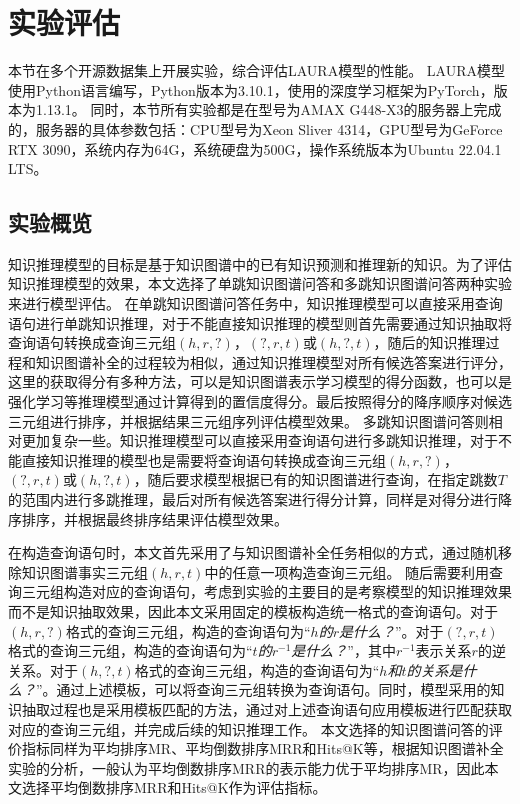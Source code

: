 \documentclass[algorithmlist, AutoFakeBold, AutoFakeSlant, figurelist, tablelist, nomlist, engineering]{seuthesix}
\begin{document}
\section{实验评估}
本节在多个开源数据集上开展实验，综合评估LAURA模型的性能。
LAURA模型使用Python语言编写，Python版本为3.10.1，使用的深度学习框架为PyTorch，版本为1.13.1。
同时，本节所有实验都是在型号为AMAX G448-X3的服务器上完成的，服务器的具体参数包括：CPU型号为Xeon Sliver 4314，GPU型号为GeForce RTX 3090，系统内存为64G，系统硬盘为500G，操作系统版本为Ubuntu 22.04.1 LTS。

\subsection{实验概览}
知识推理模型的目标是基于知识图谱中的已有知识预测和推理新的知识。为了评估知识推理模型的效果，本文选择了单跳知识图谱问答和多跳知识图谱问答两种实验来进行模型评估。
在单跳知识图谱问答任务中，知识推理模型可以直接采用查询语句进行单跳知识推理，对于不能直接知识推理的模型则首先需要通过知识抽取将查询语句转换成查询三元组$(h, r, ?)$，$(?, r, t)$或$(h, ?, t)$，随后的知识推理过程和知识图谱补全的过程较为相似，通过知识推理模型对所有候选答案进行评分，这里的获取得分有多种方法，可以是知识图谱表示学习模型的得分函数，也可以是强化学习等推理模型通过计算得到的置信度得分。最后按照得分的降序顺序对候选三元组进行排序，并根据结果三元组序列评估模型效果。
多跳知识图谱问答则相对更加复杂一些。知识推理模型可以直接采用查询语句进行多跳知识推理，对于不能直接知识推理的模型也是需要将查询语句转换成查询三元组$(h, r, ?)$，$(?, r, t)$或$(h, ?, t)$，随后要求模型根据已有的知识图谱进行查询，在指定跳数$T$的范围内进行多跳推理，最后对所有候选答案进行得分计算，同样是对得分进行降序排序，并根据最终排序结果评估模型效果。

在构造查询语句时，本文首先采用了与知识图谱补全任务相似的方式，通过随机移除知识图谱事实三元组$(h, r, t)$中的任意一项构造查询三元组。
随后需要利用查询三元组构造对应的查询语句，考虑到实验的主要目的是考察模型的知识推理效果而不是知识抽取效果，因此本文采用固定的模板构造统一格式的查询语句。对于$(h, r, ?)$格式的查询三元组，构造的查询语句为“\textit{$h$的$r$是什么？}”。对于$(?, r, t)$格式的查询三元组，构造的查询语句为“\textit{$t$的$r^{-1}$是什么？}”，其中$r^{-1}$表示关系$r$的逆关系。对于$(h, ?, t)$格式的查询三元组，构造的查询语句为“\textit{$h$和$t$的关系是什么？}”。通过上述模板，可以将查询三元组转换为查询语句。同时，模型采用的知识抽取过程也是采用模板匹配的方法，通过对上述查询语句应用模板进行匹配获取对应的查询三元组，并完成后续的知识推理工作。
本文选择的知识图谱问答的评价指标同样为平均排序MR、平均倒数排序MRR和Hits@K等，根据知识图谱补全实验的分析，一般认为平均倒数排序MRR的表示能力优于平均排序MR，因此本文选择平均倒数排序MRR和Hits@K作为评估指标。
\end{document}
